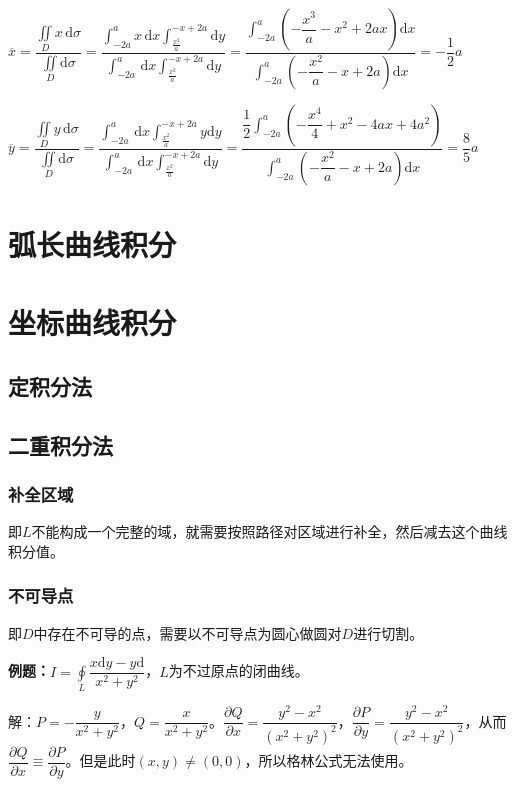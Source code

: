 $\overline{x}=\dfrac{\iint\limits_Dx\,\textrm{d}\sigma}{\iint\limits_D\textrm{d}\sigma}=\dfrac{\int_{-2a}^ax\,\textrm{d}x\int_{\frac{x^2}{a}}^{-x+2a}\textrm{d}y}{\int_{-2a}^a\,\textrm{d}x\int_{\frac{x^2}{a}}^{-x+2a}\textrm{d}y}=\dfrac{\int_{-2a}^a(-\dfrac{x^3}{a}-x^2+2ax)\textrm{d}x}{\int_{-2a}^a(-\dfrac{x^2}{a}-x+2a)\textrm{d}x}=-\dfrac{1}{2}a$

$\overline{y}=\dfrac{\iint\limits_Dy\,\textrm{d}\sigma}{\iint\limits_D\textrm{d}\sigma}=\dfrac{\int_{-2a}^a\,\textrm{d}x\int_{\frac{x^2}{a}}^{-x+2a}y\textrm{d}y}{\int_{-2a}^a\,\textrm{d}x\int_{\frac{x^2}{a}}^{-x+2a}\textrm{d}y}=\dfrac{\dfrac{1}{2}\int_{-2a}^a(-\dfrac{x^4}{4}+x^2-4ax+4a^2)}{\int_{-2a}^a(-\dfrac{x^2}{a}-x+2a)\textrm{d}x}=\dfrac{8}{5}a$

\section{弧长曲线积分}

\section{坐标曲线积分}

\subsection{定积分法}

\subsection{二重积分法}

\subsubsection{补全区域}

即$L$不能构成一个完整的域，就需要按照路径对区域进行补全，然后减去这个曲线积分值。

\subsubsection{不可导点}

即$D$中存在不可导的点，需要以不可导点为圆心做圆对$D$进行切割。

\textbf{例题：}$I=\displaystyle{\oint\limits_L\dfrac{x\textrm{d}y-y\textrm{d}}{x^2+y^2}}$，$L$为不过原点的闭曲线。

解：$P=-\dfrac{y}{x^2+y^2}$，$Q=\dfrac{x}{x^2+y^2}$。$\dfrac{\partial Q}{\partial x}=\dfrac{y^2-x^2}{(x^2+y^2)^2}$，$\dfrac{\partial P}{\partial y}=\dfrac{y^2-x^2}{(x^2+y^2)^2}$，从而$\dfrac{\partial Q}{\partial x}\equiv\dfrac{\partial P}{\partial y}$。但是此时$(x,y)\neq(0,0)$，所以格林公式无法使用。

